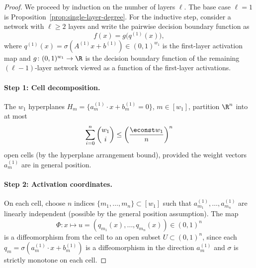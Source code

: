 \begin{proof}
We proceed by induction on the number of layers $\ell$. The base case $\ell = 1$ is Proposition~\ref{prop:single-layer-degree}. For the inductive step, consider a network with $\ell \geq 2$ layers and write the pairwise decision boundary function as
\begin{equation*}
  f(x) = g\bigl(q^{(1)}(x)\bigr),
\end{equation*}
where $q^{(1)}(x) = \sigma(A^{(1)}x + b^{(1)}) \in (0,1)^{w_1}$ is the first-layer activation map and $g\colon (0,1)^{w_1}\to \R$ is the decision boundary function of the remaining $(\ell-1)$-layer network viewed as a function of the first-layer activations.

\paragraph{Step 1: Cell decomposition.}
The $w_1$ hyperplanes $H_m = \{a_m^{(1)}\cdot x + b_m^{(1)} = 0\}$, $m\in [w_1]$, partition $\R^n$ into at most
\begin{equation*}
  \sum_{i=0}^n \binom{w_1}{i} \leq \left(\frac{\econst w_1}{n}\right)^n
\end{equation*}
open cells (by the hyperplane arrangement bound), provided the weight vectors $a_m^{(1)}$ are in general position.

\paragraph{Step 2: Activation coordinates.}
On each cell, choose $n$ indices $\{m_1,\ldots,m_n\}\subset [w_1]$ such that $a_{m_1}^{(1)},\ldots,a_{m_n}^{(1)}$ are linearly independent (possible by the general position assumption). The map
\begin{equation*}
  \Phi\colon x \mapsto u = (q_{m_1}(x),\ldots,q_{m_n}(x)) \in (0,1)^n
\end{equation*}
is a diffeomorphism from the cell to an open subset $U\subset (0,1)^n$, since each $q_m = \sigma(a_m^{(1)}\cdot x + b_m^{(1)})$ is a diffeomorphism in the direction $a_m^{(1)}$ and $\sigma$ is strictly monotone on each cell.


\end{proof}
